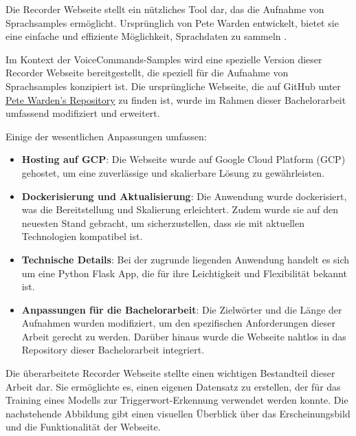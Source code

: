 \documentclass[11pt,a4paper]{article}
\begin{document}
Die Recorder Webseite stellt ein nützliches Tool dar, das die Aufnahme von Sprachsamples ermöglicht. 
Ursprünglich von Pete Warden entwickelt, bietet sie eine einfache und effiziente Möglichkeit, 
Sprachdaten zu sammeln \cite{warden2018speech}. 

\noindent \newline
Im Kontext der VoiceCommands-Samples wird eine spezielle Version dieser Recorder Webseite 
bereitgestellt, die speziell für die Aufnahme von Sprachsamples konzipiert ist. Die ursprüngliche 
Webseite, die auf GitHub unter 
\href{https://github.com/petewarden/open-speech-recording/tree/master}{Pete Warden's Repository} zu 
finden ist, wurde im Rahmen dieser Bachelorarbeit umfassend modifiziert und erweitert.

\noindent \newline
Einige der wesentlichen Anpassungen umfassen:

\begin{itemize}
    \item \textbf{Hosting auf GCP}: Die Webseite wurde auf Google Cloud Platform (GCP) gehostet, um 
	eine zuverlässige und skalierbare Lösung zu gewährleisten.
    \item \textbf{Dockerisierung und Aktualisierung}: Die Anwendung wurde dockerisiert, was die 
	Bereitstellung und Skalierung erleichtert. Zudem wurde sie auf den neuesten Stand gebracht, um 
	sicherzustellen, dass sie mit aktuellen Technologien kompatibel ist.
    \item \textbf{Technische Details}: Bei der zugrunde liegenden Anwendung handelt es sich um eine 
	Python Flask App, die für ihre Leichtigkeit und Flexibilität bekannt ist.
    \item \textbf{Anpassungen für die Bachelorarbeit}: Die Zielwörter und die Länge der Aufnahmen 
	wurden modifiziert, um den spezifischen Anforderungen dieser Arbeit gerecht zu werden. Darüber 
	hinaus wurde die Webseite nahtlos in das Repository dieser Bachelorarbeit integriert.
\end{itemize}

\noindent \newline
Die überarbeitete Recorder Webseite stellte einen wichtigen Bestandteil dieser Arbeit dar. Sie
ermöglichte es, einen eigenen Datensatz zu erstellen, der für das Training eines Modells zur
Triggerwort-Erkennung verwendet werden konnte. Die nachstehende Abbildung gibt einen visuellen 
Überblick über das Erscheinungsbild und die Funktionalität der Webseite.
\end{document}
